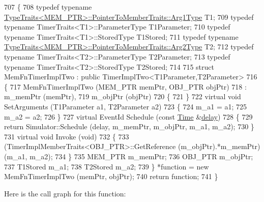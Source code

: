 \begin{DoxyCode}
707 \{
708   \textcolor{keyword}{typedef} \textcolor{keyword}{typename} \hyperlink{structTypeTraits}{TypeTraits<MEM\_PTR>::PointerToMemberTraits::Arg1Type}
       T1;
709   \textcolor{keyword}{typedef} \textcolor{keyword}{typename} TimerTraits<T1>::ParameterType T1Parameter;
710   \textcolor{keyword}{typedef} \textcolor{keyword}{typename} TimerTraits<T1>::StoredType T1Stored;
711   \textcolor{keyword}{typedef} \textcolor{keyword}{typename} \hyperlink{structTypeTraits}{TypeTraits<MEM\_PTR>::PointerToMemberTraits::Arg2Type}
       T2;
712   \textcolor{keyword}{typedef} \textcolor{keyword}{typename} TimerTraits<T2>::ParameterType T2Parameter;
713   \textcolor{keyword}{typedef} \textcolor{keyword}{typename} TimerTraits<T2>::StoredType T2Stored;
714 
715   \textcolor{keyword}{struct }MemFnTimerImplTwo : \textcolor{keyword}{public} TimerImplTwo<T1Parameter,T2Parameter>
716   \{
717     MemFnTimerImplTwo (MEM\_PTR memPtr, OBJ\_PTR objPtr)
718       : m\_memPtr (memPtr),
719         m\_objPtr (objPtr)
720     \{
721     \}
722     \textcolor{keyword}{virtual} \textcolor{keywordtype}{void} SetArguments (T1Parameter a1, T2Parameter a2)
723     \{
724       m\_a1 = a1;
725       m\_a2 = a2;
726     \}
727     \textcolor{keyword}{virtual} EventId Schedule (\textcolor{keyword}{const} \hyperlink{namespacens3_1_1TracedValueCallback_a7ffd3e7c142ffe7c8a1d2db9b8de38ec}{Time} &\hyperlink{lte_2model_2fading-traces_2fading__trace__generator_8m_a7964e6aa8f61a9d28973c8267a606ad8}{delay})
728     \{
729       \textcolor{keywordflow}{return} Simulator::Schedule (delay, m\_memPtr, m\_objPtr, m\_a1, m\_a2);
730     \}
731     \textcolor{keyword}{virtual} \textcolor{keywordtype}{void} Invoke (\textcolor{keywordtype}{void})
732     \{
733       (TimerImplMemberTraits<OBJ\_PTR>::GetReference (m\_objPtr).*m\_memPtr)(m\_a1, m\_a2);
734     \}
735     MEM\_PTR m\_memPtr;
736     OBJ\_PTR m\_objPtr;
737     T1Stored m\_a1;
738     T2Stored m\_a2;
739   \} *\textcolor{keyword}{function} = \textcolor{keyword}{new} MemFnTimerImplTwo (memPtr, objPtr);
740   \textcolor{keywordflow}{return} \textcolor{keyword}{function};
741 \}
\end{DoxyCode}


Here is the call graph for this function\+:


